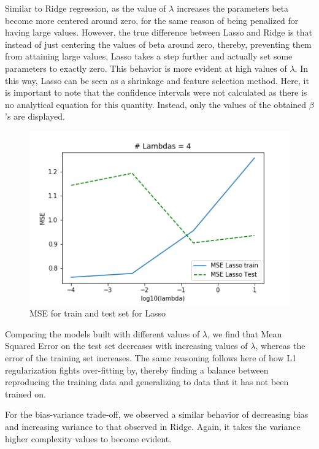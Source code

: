 \documentclass{article}
\begin{document}
Similar to Ridge regression, as the value of $\lambda$ increases the parameters beta become more centered around zero, for the same reason of being penalized for having large values. However, the true difference between Lasso and Ridge is that instead of just centering the values of beta around zero, thereby, preventing them from attaining large values, Lasso takes a step further and actually set some parameters to exactly zero. This behavior is more evident at high values of $\lambda$. In this way, Lasso can be seen as a shrinkage and feature selection method.
Here, it is important to note that the confidence intervals were not calculated as there is no analytical equation for this quantity. Instead, only the values of the obtained $\beta$'s are displayed.
\begin{figure}[h]
\includegraphics[scale=0.5]{Plots/lassoRegressionModelplot.png}
\centering
\caption{MSE for train and test set for Lasso}
\label{fig:lassoTrainTest}
\end{figure}
Comparing the models built with different values of $\lambda$, we find that Mean Squared Error on the test set decreases with increasing values of $\lambda$, whereas the error of the training set increases. The same reasoning follows here of how L1 regularization fights over-fitting by, thereby finding a balance between reproducing the training data and generalizing to data that it has not been trained on.

For the bias-variance trade-off, we observed a similar behavior of decreasing bias and increasing variance to that observed in Ridge. Again, it takes the variance higher complexity values to become evident.
\end{document}
